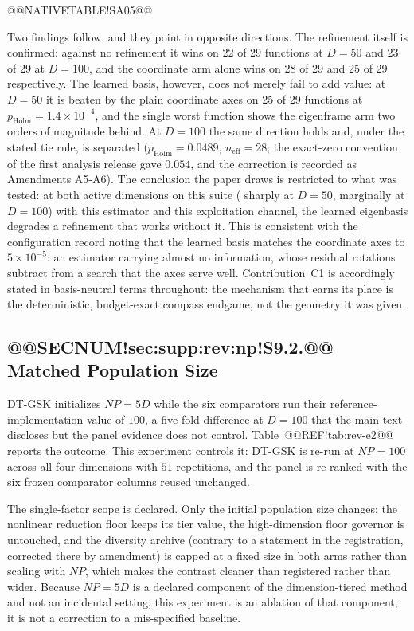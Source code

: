\documentclass[10pt,a4paper]{article}
\newcommand{\dtgsk}{DT-GSK}
\begin{document}
@@NATIVETABLE!SA05@@




Two findings follow, and they point in opposite directions.  The refinement
itself is confirmed: against no refinement it wins on 22 of 29 functions at
$D = 50$ and 23 of 29 at $D = 100$, and the coordinate arm alone wins on 28 of
29 and 25 of 29 respectively.  The learned basis, however, does not merely fail
to add value: at $D = 50$ it is beaten by the plain coordinate axes on 25 of
29 functions at $p_{\mathrm{Holm}} = 1.4\times10^{-4}$, and the single worst
function shows the eigenframe arm two orders of magnitude behind.  At $D = 100$
the same direction holds and, under the stated tie rule, is separated
($p_{\mathrm{Holm}} = 0.0489$, $n_{\mathrm{eff}} = 28$; the exact-zero
convention of the first analysis release gave $0.054$, and the correction is
recorded as Amendments A5-A6).  The conclusion the paper draws is
restricted to what was tested: at both active dimensions on this suite (
sharply at $D = 50$, marginally at $D = 100$) with this estimator and
this exploitation channel, the learned eigenbasis degrades a refinement that
works without it.  This is consistent with the configuration record noting that
the learned basis matches the coordinate axes to $5\times10^{-5}$: an
estimator carrying almost no information, whose residual rotations subtract from
a search that the axes serve well.  Contribution~C1 is accordingly stated in
basis-neutral terms throughout: the mechanism that earns its place is the
deterministic, budget-exact compass endgame, not the geometry it was given.


\subsection{@@SECNUM!sec:supp:rev:np!S9.2.@@ Matched Population Size}\label{sec:supp:rev:np}

\dtgsk{} initializes $NP = 5D$ while the six comparators run their
reference-implementation value of $100$, a five-fold difference at $D = 100$
that the main text discloses but the panel evidence does not control.
Table~@@REF!tab:rev-e2@@ reports the outcome.  This experiment
controls it: \dtgsk{} is re-run at $NP = 100$ across all four dimensions with
$51$ repetitions, and the panel is re-ranked with the six frozen comparator
columns reused unchanged.

The single-factor scope is declared.  Only the initial population size changes:
the nonlinear reduction floor keeps its tier value, the high-dimension floor
governor is untouched, and the diversity archive (contrary to a statement in the
registration, corrected there by amendment) is capped at a fixed size in both
arms rather than scaling with $NP$, which makes the contrast cleaner than
registered rather than wider.  Because $NP = 5D$ is a declared component of the
dimension-tiered method and not an incidental setting, this experiment is an
ablation of that component; it is not a correction to a mis-specified baseline.
\end{document}
